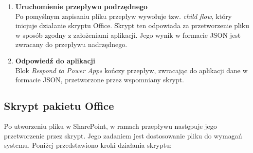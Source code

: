 \begin{enumerate}
    \item \textbf{Uruchomienie przepływu podrzędnego} \\
    Po pomyślnym zapisaniu pliku przepływ wywołuje tzw. \textit{child flow}, który inicjuje działanie skryptu Office. Skrypt ten odpowiada za przetworzenie pliku w sposób zgodny z założeniami aplikacji. Jego wynik w formacie JSON jest zwracany do przepływu nadrzędnego. 

    \item \textbf{Odpowiedź do aplikacji} \\
    Blok \textit{Respond to Power Apps} kończy przepływ, zwracając do aplikacji dane w formacie JSON, przetworzone przez wspomniany skrypt.
\end{enumerate}

\subsection{Skrypt pakietu Office}
Po utworzeniu pliku w SharePoint, w ramach przepływu następuje jego przetworzenie przez skrypt. Jego zadaniem jest dostosowanie pliku do wymagań systemu. Poniżej przedstawiono kroki działania skryptu:

